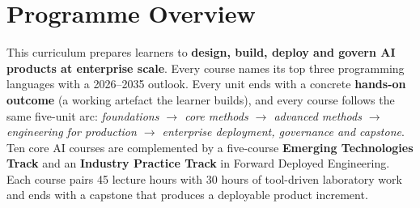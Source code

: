 \documentclass[10pt,a4paper]{article}
\begin{document}
\section*{Programme Overview}
This curriculum prepares learners to \textbf{design, build, deploy and govern AI products at enterprise scale}. Every course names its top three programming languages with a 2026--2035 outlook. Every unit ends with a concrete \textbf{hands-on outcome} (a working artefact the learner builds), and every course follows the same five-unit arc: \emph{foundations $\rightarrow$ core methods $\rightarrow$ advanced methods $\rightarrow$ engineering for production $\rightarrow$ enterprise deployment, governance and capstone}. Ten core AI courses are complemented by a five-course \textbf{Emerging Technologies Track} and an \textbf{Industry Practice Track} in Forward Deployed Engineering. Each course pairs 45 lecture hours with 30 hours of tool-driven laboratory work and ends with a capstone that produces a deployable product increment.
\end{document}
